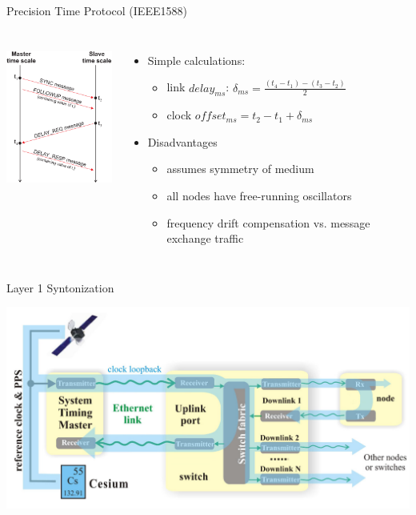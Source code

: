 \documentclass[compress,red]{beamer}
\begin{document}
\begin{frame}{Precision Time Protocol (IEEE1588)}

\begin{columns}[c]
  \column{1.2in}
  \begin{center}
    \includegraphics[height=5cm]{protocol/ptp_exchange.pdf}
  \end{center}
  \column{3in}
    
  
  \begin{itemize}
    \item Simple calculations:
    \begin{itemize}
      \item link $delay_{ms}$: $\delta_{ms} = \frac{(t_{4}-t_{1}) - (t_{3}-t_{2})}{2}$
      \item clock $offset_{ms} = t_{2} - t_{1} + \delta_{ms}$
    \end{itemize}
   \item<2> Disadvantages
     \begin{itemize}
       \item assumes symmetry of medium
       \item all nodes have free-running oscillators
       \item frequency drift compensation vs. message exchange traffic
     \end{itemize}
   \end{itemize}
\end{columns}

\end{frame}

\begin{frame}{Layer 1 Syntonization}

  \begin{center}
    \includegraphics[width=1.0\textwidth]{misc/l1_sync.pdf}
  \end{center}
\end{frame}
\end{document}
